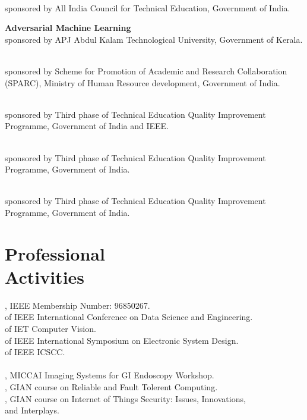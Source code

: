 \documentclass[mm]{simple_style}
\begin{document}
\begin{resume}
  \\
sponsored by All India Council for Technical Education, Government of India. 

\textbf{Adversarial Machine Learning}   \\
sponsored by APJ Abdul Kalam Technological University, Government of Kerala.

  \\
sponsored by Scheme for Promotion of Academic and Research Collaboration (SPARC), Ministry of Human Resource development, Government of India. 

  \\ 
sponsored by Third phase of Technical Education Quality Improvement Programme, Government of India and IEEE.

  \\
sponsored by Third phase of Technical Education Quality Improvement Programme, Government of India. 

  \\
sponsored by Third phase of Technical Education Quality Improvement Programme, Government of India.

\vspace{-2ex}
\sectionline

\section{Professional \\Activities}


, IEEE Membership Number: 96850267. \\
 of IEEE International Conference on Data Science and Engineering. \\
 of IET Computer Vision. \\
 of IEEE International Symposium on Electronic System Design. \\
 of IEEE ICSCC. \\ \\
, MICCAI Imaging Systems for GI Endoscopy Workshop.  \\
, GIAN course on Reliable and Fault Tolerent Computing.  \\
, GIAN course on Internet of Things Security: Issues, Innovations, \\and Interplays.


\end{resume}
\end{document}
